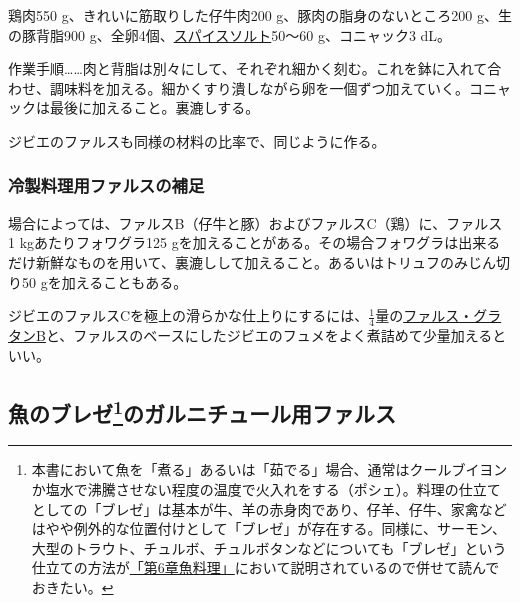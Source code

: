 \begin{recette}
鶏肉550 g、きれいに筋取りした仔牛肉200 g、豚肉の脂身のないところ200
g、生の豚背脂900
g、全卵4個、\protect\hyperlink{sel-epice}{スパイスソルト}50〜60
g、コニャック3 dL。

作業手順\ldots{}\ldots{}肉と背脂は別々にして、それぞれ細かく刻む。これを鉢に入れて合わせ、調味料を加える。細かくすり潰しながら卵を一個ずつ加えていく。コニャックは最後に加えること。裏漉しする。

ジビエのファルスも同様の材料の比率で、同じように作る。

\hypertarget{observation-sur-les-farces}{%
\subsubsection{冷製料理用ファルスの補足}\label{observation-sur-les-farces}}

場合によっては、ファルスB（仔牛と豚）およびファルスC（鶏）に、ファルス 1
kgあたりフォワグラ125
gを加えることがある。その場合フォワグラは出来るだけ新鮮なものを用いて、裏漉しして加えること。あるいはトリュフのみじん切り50
gを加えることもある。

ジビエのファルスCを極上の滑らかな仕上りにするには、\(\frac{1}{4}\)量の\protect\hyperlink{farce-gratin-b}{ファルス・グラタンB}と、ファルスのベースにしたジビエのフュメをよく煮詰めて少量加えるといい。
\end{recette}
\hypertarget{farces-speciales-pour-garnir-les-poissons-braises}{%
\subsection[魚のブレゼのガルニチュール用ファルス]{\texorpdfstring{魚のブレゼ\footnote{本書において魚を「煮る」あるいは「茹でる」場合、通常はクールブイヨンか塩水で沸騰させない程度の温度で火入れをする（ポシェ）。料理の仕立てとしての「ブレゼ」は基本が牛、羊の赤身肉であり、仔羊、仔牛、家禽などはやや例外的な位置付けとして「ブレゼ」が存在する。同様に、サーモン、大型のトラウト、チュルボ、チュルボタンなどについても「ブレゼ」という仕立ての方法が\protect\hyperlink{cuisson-des-poissons-par-le-braisage}{「第6章魚料理」}において説明されているので併せて読んでおきたい。}のガルニチュール用ファルス}{魚のブレゼのガルニチュール用ファルス}}\label{farces-speciales-pour-garnir-les-poissons-braises}}

